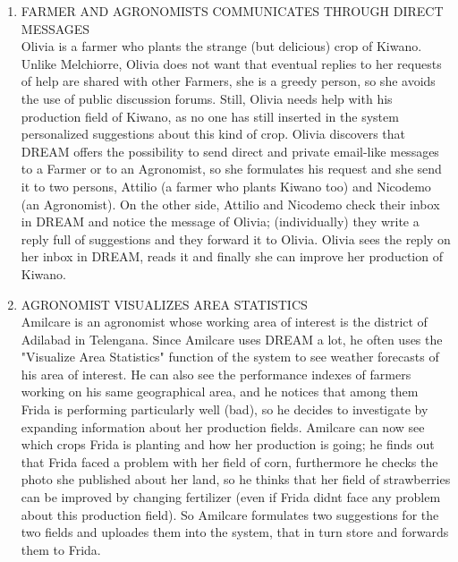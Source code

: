 \begin{enumerate}[label=\textbf{SCENARIO \arabic*}]
	
			\item \label{sce:sce4} FARMER AND AGRONOMISTS COMMUNICATES THROUGH DIRECT MESSAGES \\ 
			Olivia is a farmer who plants the strange (but delicious) crop of Kiwano. Unlike Melchiorre, Olivia does not want that eventual replies to her requests of help are shared with other Farmers, she is a greedy person, so she avoids
			the use of public discussion forums. Still, Olivia needs help with his production field of Kiwano, as no one has still inserted in the system personalized suggestions about this kind of crop.
			Olivia discovers that DREAM offers the possibility to send direct and private email-like messages to a Farmer or to an Agronomist, so she formulates his request and she send it to two persons, Attilio (a farmer who plants Kiwano too) and Nicodemo (an Agronomist).
			On the other side, Attilio and Nicodemo check their inbox in DREAM and notice the message of Olivia; (individually) they write a reply full of suggestions and they forward it to Olivia.
			Olivia sees the reply on her inbox in DREAM, reads it and finally she can improve her production of Kiwano.
			
			\item \label{sce:sce5} AGRONOMIST VISUALIZES AREA STATISTICS \\ 
			Amilcare is an agronomist whose working area of interest is the district of Adilabad in Telengana. Since Amilcare uses DREAM a lot, he often uses the "Visualize Area Statistics" function of the system to see  weather forecasts of
			his area of interest. He can also see the performance indexes of farmers working on his same geographical area, and he notices that among them Frida is performing particularly well (bad), so he decides to investigate by expanding information about her production fields. Amilcare can now see which crops Frida is planting and how her production is going; he finds out that Frida faced a problem with her field of corn, furthermore he checks the photo she published about her land, so he thinks that her field of strawberries can be improved by changing fertilizer (even if Frida didnt face any problem about this production field). So Amilcare formulates two suggestions for the two fields and uploades them into the system, that in turn store and forwards them to Frida.
			

\end{enumerate}
